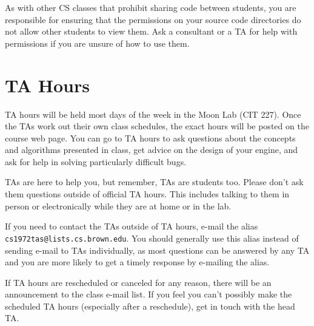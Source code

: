 \documentclass{cs1972}
\begin{document}
 As with other CS classes that prohibit sharing code between students, you are responsible for ensuring that the permissions on your source code directories do not allow other students to view them. Ask a consultant or a TA for help with permissions if you are unsure of how to use them.
 
 \section*{TA Hours}
 TA hours will be held most days of the week in the Moon Lab (CIT 227). Once the TAs work out their own class schedules, the exact hours will be posted on the course web page. You can go to TA hours to ask questions about the concepts and algorithms presented in class, get advice on the design of your engine, and ask for help in solving particularly difficult bugs.
 
 TAs are here to help you, but remember, TAs are students too. Please don't ask them questions outside of official TA hours. This includes talking to them in person or electronically while they are at home or in the lab.
 
 If you need to contact the TAs outside of TA hours, e-mail the alias \texttt{cs1972tas@lists.cs.brown.edu}. You should generally use this alias instead of sending e-mail to TAs individually, as most questions can be answered by any TA and you are more likely to get a timely response by e-mailing the alias.
 
 If TA hours are rescheduled or canceled for any reason, there will be an announcement to the class e-mail list. If you feel you can't possibly make the scheduled TA hours (especially after a reschedule), get in touch with the head TA. 
 
\end{document}

